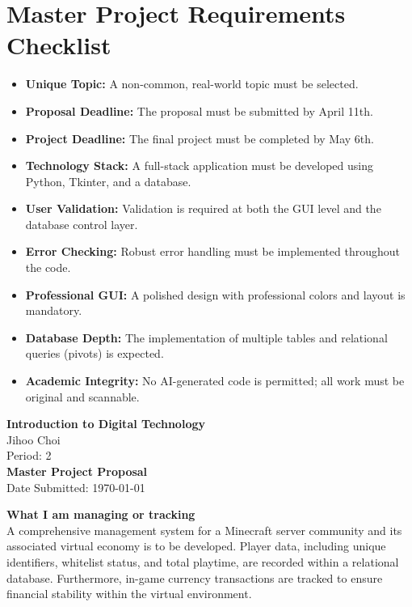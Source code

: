 \documentclass{article}
\begin{document}
\section*{Master Project Requirements Checklist}
\begin{itemize}[label=$\square$]
  \item \textbf{Unique Topic:} A non-common, real-world topic must be selected.
  \item \textbf{Proposal Deadline:} The proposal must be submitted by April 11th.
  \item \textbf{Project Deadline:} The final project must be completed by May 6th.
  \item \textbf{Technology Stack:} A full-stack application must be developed using Python, Tkinter, and a database.
  \item \textbf{User Validation:} Validation is required at both the GUI level and the database control layer.
  \item \textbf{Error Checking:} Robust error handling must be implemented throughout the code.
  \item \textbf{Professional GUI:} A polished design with professional colors and layout is mandatory.
  \item \textbf{Database Depth:} The implementation of multiple tables and relational queries (pivots) is expected.
  \item \textbf{Academic Integrity:} No AI-generated code is permitted; all work must be original and scannable.
\end{itemize}

\newpage

\textbf{Introduction to Digital Technology} \\
Jihoo Choi \\
Period: 2 \\
\textbf{Master Project Proposal} \\
Date Submitted: \today{}

\vspace{1em}

\textbf{What I am managing or tracking} \\
A comprehensive management system for a Minecraft server community and its associated virtual economy is to be developed. Player data, including unique identifiers, whitelist status, and total playtime, are recorded within a relational database. Furthermore, in-game currency transactions are tracked to ensure financial stability within the virtual environment. 
\end{document}
